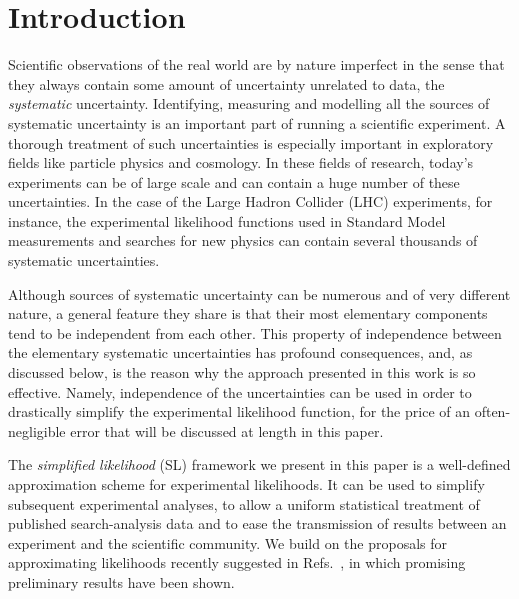 \documentclass[11pt]{article}
\begin{document}



\noindent
\newpage




\section{Introduction}


Scientific observations of the real world are by nature imperfect in the sense that they always contain some amount of
uncertainty unrelated to data, the \textit{systematic}   uncertainty. Identifying, measuring and modelling all the sources of systematic uncertainty is an important part of running a scientific experiment. A thorough treatment of such uncertainties is especially important in exploratory fields like particle physics and cosmology. In these fields of research,  %
today's experiments  can be of large scale and can contain a huge number of these  uncertainties. In the case of the Large Hadron Collider (LHC) experiments, for instance, the experimental likelihood functions used in Standard Model measurements and searches for new physics can contain several thousands of systematic uncertainties.

Although sources of systematic uncertainty can be numerous and of very different nature, a general feature they share is that their most elementary components tend to be independent from each other. This property of independence between the elementary systematic uncertainties has profound consequences, and, as discussed below, is the reason why the approach presented in this work is so effective. Namely, independence of the uncertainties can be used in order to drastically simplify the experimental likelihood function, for the price of an often-negligible error that will be discussed at length in this paper.

The \textit{simplified likelihood} (SL) framework we present in this paper is a well-defined approximation scheme for experimental likelihoods. It can be used to simplify subsequent experimental analyses, to allow a uniform statistical treatment of published search-analysis data and to ease the transmission of results between an experiment and the scientific community.
We build on the proposals for approximating likelihoods recently suggested in Refs.~\cite{Fichet:2016gvx,SL_note}, in which promising preliminary results have been shown.
\end{document}

